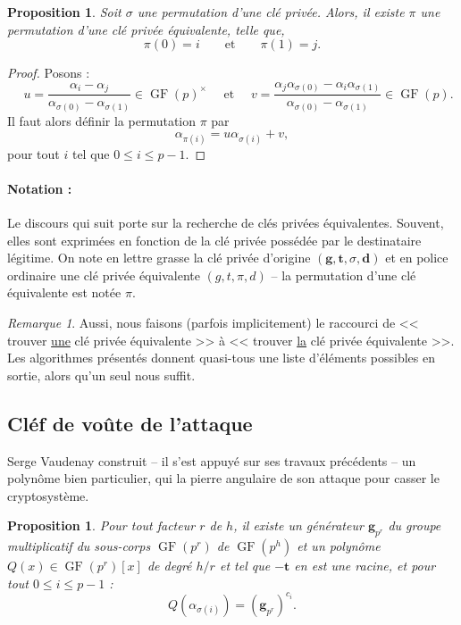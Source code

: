 \documentclass[a4paper, titlepage, 11pt]{article}
\newtheorem{prop}[theo]{Proposition}
\theoremstyle{definition}
\theoremstyle{remark}
\newtheorem{rema}[theo]{Remarque}
\def\gf{\operatorname{GF}}
\def\mbf#1{\mathbf{#1}}
\begin{document}
\begin{prop}\label{prop:permutation}
Soit $\sigma$ une permutation d'une clé privée. Alors, il existe $\pi$ une permutation d'une clé privée équivalente, telle que, $$\pi(0) = i \qquad \text{et}\qquad \pi(1) = j.$$
\end{prop}

\begin{proof}
Posons :
$$\quad u = \frac{\alpha_i - \alpha_j}{\alpha_{\sigma(0)}- \alpha_{\sigma(1)}} \in \gf(p)^\times \quad \text{ et } \quad v =  \frac{\alpha_j\alpha_{\sigma(0)} - \alpha_i\alpha_{\sigma(1)}}{\alpha_{\sigma(0)}- \alpha_{\sigma(1)}} \in \gf(p).$$
Il faut alors définir la permutation $\pi$ par
 $$\alpha_{\pi(i)} = u\alpha_{\sigma(i)} + v,$$
 pour tout $i$ tel que $0 \leqslant i \leqslant p-1$.
\end{proof}

\paragraph*{Notation :} Le discours qui suit porte sur la recherche de clés privées équivalentes. Souvent, elles sont exprimées en fonction de la clé privée possédée par le destinataire légitime. On note en lettre grasse la clé privée d'origine $(\mbf{g}, \mbf{t}, \sigma, \mbf{d})$ et en police ordinaire une clé privée équivalente $(g, t, \pi, d)$ -- la permutation d'une clé équivalente est notée $\pi$.

\begin{rema}
Aussi, nous faisons (parfois implicitement) le raccourci de << trouver \underline{une} clé privée équivalente >> à << trouver \underline{la} clé privée équivalente >>. Les algorithmes présentés donnent quasi-tous une liste d'éléments possibles en sortie, alors qu'un seul nous suffit.
\end{rema}

\subsection{Cléf de voûte de l'attaque}

Serge Vaudenay construit -- il s'est appuyé sur ses travaux précédents -- un polynôme bien particulier, qui la pierre angulaire de son attaque pour casser le cryptosystème.

\begin{prop}\label{premierePropVaudenay}
Pour tout facteur $r$ de $h$, il existe un générateur $\mbf g_{p^r}$ du groupe multiplicatif du sous-corps $\gf(p^r)$ de $\gf(p^h)$ et un polynôme $Q(x) \in \gf(p^r)[x]$ de degré $h/r$ et tel que $-\mbf t$ en est une racine, et pour tout $0\leqslant i \leqslant p-1$ :
$$Q\left(\alpha_{\sigma(i)}\right) = (\mbf g_{p^r})^{c_i}.$$
\end{prop}
\end{document}
